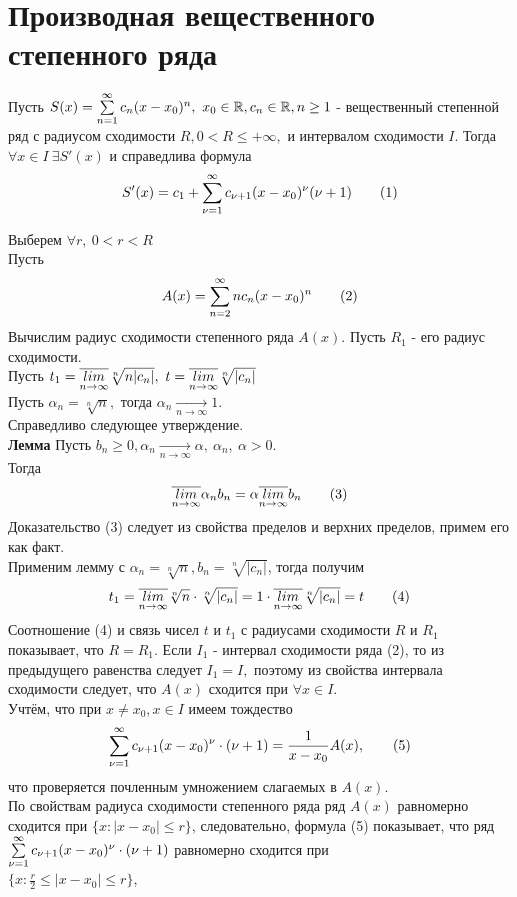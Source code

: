 \documentclass[main]{subfiles}
\begin{document}
\section{Производная вещественного степенного ряда}
\begin{theorem}
     Пусть $S(x)=\su c_n(x-x_0)^n,\ x_0\in\R, c_n\in\R, n\geq 1$ - вещественный степенной ряд с радиусом сходимости $R,
      0<R\leq+\infty,$ и интервалом сходимости $I$. Тогда $\forall x\in I\ \exists S'(x)$ и справедлива формула
       \[ S'(x)=c_1+\su[\nu=1] c_{\nu+1}(x-x_0)^\nu (\nu+1)\tag{1} \]
\end{theorem}
\begin{longProof}
     Выберем $\forall r,\ 0<r<R$\\
Пусть \[ A(x)=\su[n=2] nc_n(x-x_0)^n\tag{2} \]
Вычислим радиус сходимости степенного ряда $A(x).$ Пусть $R_1$ - его радиус сходимости.\\
Пусть $t_1=\overline{\Lim}\sqrt[n]{n|c_n|},\ t=\overline{\Lim}\sqrt[n]{|c_n|}$\\
Пусть $\alpha_n=\sqrt[n]{n},$ тогда $\alpha_n\underset{n\to\infty}{\rightarrow} 1.$\\ Справедливо следующее утверждение.\\
\textbf{Лемма} Пусть $b_n\geq 0, \alpha_n\underset{n\to\infty}{\rightarrow}\alpha,\ \alpha_n,\ \alpha>0.$\\
Тогда \[ \overline{\Lim} \alpha_n b_n=\alpha\overline{\Lim} b_n\tag{3}\]
Доказательство (3) следует из свойства пределов и верхних пределов, примем его как факт.\\
Применим лемму с $\alpha_n=\sqrt[n]{n}, b_n=\sqrt[n]{|c_n|}$, тогда получим 
\[ t_1=\overline{\Lim} \sqrt[n]{n}\cdot\sqrt[n]{|c_n|}=1\cdot\overline{\Lim}\sqrt[n]{|c_n|}=t\tag{4} \]
Соотношение (4) и связь чисел $t$ и $t_1$ с радиусами сходимости $R$ и $R_1$ показывает, что $R=R_1.$
 Если $I_1$ - интервал сходимости ряда (2), то из предыдущего равенства следует $I_1=I,$ поэтому из свойства интервала сходимости следует,
  что $A(x)$ сходится при $\forall x\in I.$\\ Учтём, что при $x\ne x_0, x\in I$ имеем тождество 
  \[ \su[\nu=1] c_{\nu+1}(x-x_0)^{\nu}\cdot(\nu+1)=\frac{1}{x-x_0}A(x),\tag{5} \]
что проверяется почленным умножением слагаемых в $A(x).$\\ По свойствам радиуса сходимости степенного ряда ряд $A(x)$ равномерно
 сходится при $\{ x:|x-x_0|\leq r\}$, следовательно, формула (5) показывает, что ряд $\su[\nu=1]
  c_{\nu+1}(x-x_0)^{\nu}\cdot(\nu+1)$ равномерно сходится при\\ $\{ x: \frac{r}{2}\leq|x-x_0|\leq r\}$,

\end{longProof}
\end{document}
